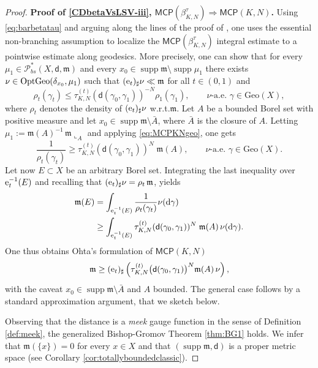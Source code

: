 \documentclass[11pt,a4paper]{article}
\theoremstyle{plain}
\theoremstyle{definition}
\theoremstyle{remark}
\numberwithin{equation}{section}
\DeclareMathOperator{\supp}{\mathrm{supp}}
\newcommand{\Geo}{\mathrm{Geo}}
\newcommand{\MCP}{\mathsf{MCP}}
\newcommand{\OptGeo}{{\rm OptGeo}}
\newcommand{\Prob}{\mathcal{P}}
\newcommand{\di}{\mathrm{d}}
\newcommand{\mm}{\mathfrak m}
\newcommand{\ee}{{\rm e}}
\newcommand{\sfd}{\mathsf d}
\begin{document}
\begin{proof}
\textbf{Proof of \ref{CDbetaVsLSV-iii}, $\MCP(\beta_{K,N}^{\tau})\Rightarrow \MCP(K,N)$.} Using \eqref{eq:barbetatau} and arguing along the lines of the proof of \cite[Thm.\@ 3.12, (iii) $\Rightarrow$ (ii)]{EKS}, one uses the essential non-branching assumption to localize the $\MCP(\beta_{K,N}^{\tau})$ integral estimate to a pointwise estimate along geodesics. More precisely, one can show that for every $\mu_1\in \Prob_{bs}^{*}(X,\sfd,\mm)$ and every $x_{0}\in \supp \mm \setminus \supp \mu_1$  there exists  $\nu\in \OptGeo(\delta_{x_{0}}, \mu_{1})$ such that $(\ee_{t})_{\sharp} \nu\ll \mm$ for all $t\in (0,1)$ and
\begin{equation}\label{eq:MCPKNgeo}
\rho_{t}(\gamma_{t})\leq \tau_{K, N}^{(t)} (\sfd(\gamma_{0}, \gamma_{1}))^{-N} \rho_{1}(\gamma_{1}), \qquad \nu\text{-a.e. } \gamma \in \Geo(X),
\end{equation}
where $\rho_{t}$ denotes the density of $(\ee_{t})_{\sharp}\nu$ w.r.t.\@ $\mm$. Let $A$ be a bounded Borel set with positive measure and let $x_{0} \in \supp\mm \setminus  \bar{A}$, where $\bar{A}$ is the closure of $A$. Letting $\mu_1:=\mm(A)^{-1} \, \mm\llcorner_{A}$ and applying \eqref{eq:MCPKNgeo},  one gets
\begin{equation}
\frac{1}{\rho_{t}(\gamma_{t})} \geq  \tau_{K, N}^{(t)} (\sfd(\gamma_{0}, \gamma_{1}))^{N}\; \mm(A)  , \qquad \nu\text{-a.e. } \gamma \in \Geo(X).
\end{equation}
Let now $E\subset X$ be an arbitrary Borel set. Integrating the last inequality over $\ee_t^{-1}(E)$ and recalling that $(\ee_{t})_{\sharp}\nu=\rho_t \, \mm$,  yields
\begin{align*}
\mm(E)&= \int_{\ee_t^{-1}(E)} \frac{1}{\rho_{t}(\gamma_{t})} \nu(\di \gamma)  \\
&\geq   \int_{\ee_t^{-1}(E)} \tau_{K, N}^{(t)} (\sfd(\gamma_{0}, \gamma_{1}))^{N}\; \mm(A)  \, \nu(\di \gamma).
\end{align*}
One thus obtains Ohta's \cite{OhtaMCP} formulation of $\MCP(K,N)$
\begin{equation}\label{eq:OhtaMCP}
\mm \geq  (\ee_{t})_{\sharp} \left(\tau_{K,N}^{(t)}\big(\sfd(\gamma_{0},\gamma_{1})\big)^{N} \mm(A) \, \nu \right),
\end{equation}
 with the caveat  $x_{0}\in \supp \mm \setminus \bar{A}$ and $A$ bounded. The general case follows by a standard approximation argument, that we sketch below.
 
Observing that the distance is a \emph{meek} gauge function in the sense of Definition \ref{def:meek}, the generalized Bishop-Gromov Theorem \ref{thm:BG1} holds. We infer that $\mm(\{x\})=0$ for every $x\in X$ and that $(\supp\mm, \sfd)$ is a proper metric space (see Corollary \ref{cor:totallyboundedclassic}).
 

\end{proof}
\end{document}
